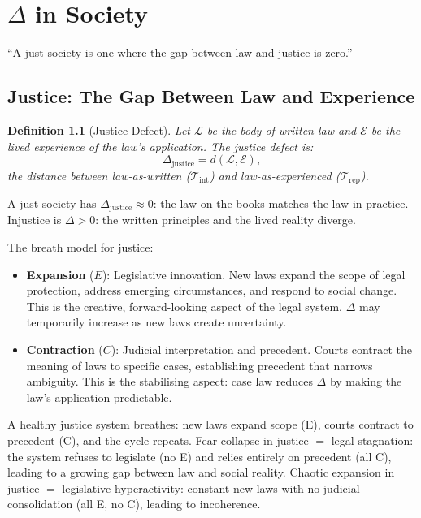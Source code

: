 \documentclass[12pt, openany]{book}
\newtheorem{definition}[theorem]{Definition}
\theoremstyle{remark}
\newcommand{\Tint}{\mathcal{T}_{\mathrm{int}}}
\newcommand{\Trep}{\mathcal{T}_{\mathrm{rep}}}
\begin{document}
\chapter{$\Delta$ in Society}
\label{ch:society}

\epigraph{``A just society is one where the gap between law and justice is zero.''}{}

\section{Justice: The Gap Between Law and Experience}
\label{sec:justice}

\begin{definition}[Justice Defect]
\label{def:justice-defect}
Let $\mathcal{L}$ be the body of written law and $\mathcal{E}$ be the lived
experience of the law's application.  The justice defect is:
\[
  \Delta_{\mathrm{justice}} = d(\mathcal{L}, \mathcal{E}),
\]
the distance between law-as-written ($\Tint$) and law-as-experienced ($\Trep$).
\end{definition}

\noindent
A just society has $\Delta_{\mathrm{justice}} \approx 0$: the law on the books
matches the law in practice.  Injustice is $\Delta > 0$: the written principles
and the lived reality diverge.

The breath model for justice:
\begin{itemize}
  \item \textbf{Expansion} ($E$): Legislative innovation.  New laws expand the scope
        of legal protection, address emerging circumstances, and respond to social
        change.  This is the creative, forward-looking aspect of the legal system.
        $\Delta$ may temporarily increase as new laws create uncertainty.
  \item \textbf{Contraction} ($C$): Judicial interpretation and precedent.  Courts
        contract the meaning of laws to specific cases, establishing precedent that
        narrows ambiguity.  This is the stabilising aspect: case law reduces $\Delta$
        by making the law's application predictable.
\end{itemize}

\noindent
A healthy justice system breathes: new laws expand scope (E), courts contract to
precedent (C), and the cycle repeats.  Fear-collapse in justice $=$ legal
stagnation: the system refuses to legislate (no E) and relies entirely on
precedent (all C), leading to a growing gap between law and social reality.
Chaotic expansion in justice $=$ legislative hyperactivity: constant new laws
with no judicial consolidation (all E, no C), leading to incoherence.
\end{document}

